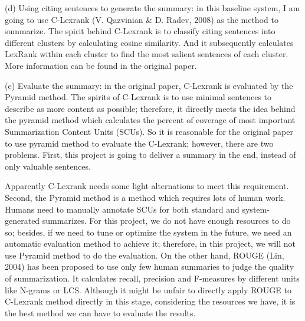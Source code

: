 \documentclass[hyp]{socreport}
\begin{document}
(d) Using citing sentences to generate the summary: in this baseline
system, I am going to use C-Lexrank (V. Qazvinian \& D. Radev, 2008)
as the 
method to summarize. The spirit behind C-Lexrank is to classify citing
sentences into different clusters by calculating cosine similarity.
And it 
subsequently calculates LexRank within each cluster to find the most
salient sentences of each cluster. More information can be found in
the original paper. 

(e) Evaluate the summary: in the original paper, C-Lexrank is
evaluated by the Pyramid method. The spirits of C-Lexrank is to use
minimal 
sentences to describe as more content as possible; therefore, it
directly meets the idea behind the pyramid method which calculates the 
percent of coverage of most important Summarization Content Units
(SCUs). So it is reasonable for the original paper to use pyramid
method 
to evaluate the C-Lexrank; however, there are two problems. First,
this project is going to deliver a summary in the end, instead of only
valuable sentences. 

Apparently C-Lexrank needs some light alternations to meet this
requirement. Second, the Pyramid method is a method which 
requires lots of human work. Humans need to manually annotate SCUs for
both standard and system-generated summarizes. For this project, we do
not 
have enough resources to do so; besides, if we need to tune or
optimize the system in the future, we need an automatic evaluation
method to 
achieve it; therefore, in this project, we will not use Pyramid method
to do the evaluation. On the other hand, ROUGE (Lin, 2004) has been 
proposed to use only few human summaries to judge the quality of
summarization. It calculates recall, precision and F-measures by
different 
units like N-grams or LCS. Although it might be unfair to directly
apply ROUGE to C-Lexrank method directly in this stage, considering
the 
resources we have, it is the best method we can have to evaluate the
results.
\end{document}
